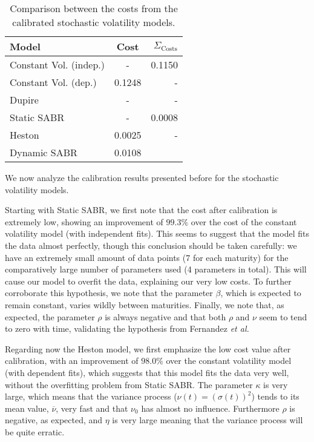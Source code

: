 \begin{table}[H]
    \centering
        \renewcommand{\arraystretch}{0.8}
\begin{tabular}{@{}lcr@{}}
\toprule
 Model & Cost & $\Sigma_{\mathrm{Costs}}$ \\ \midrule
Constant Vol. (indep.) & - & 0.1150 \\
Constant Vol. (dep.) & 0.1248 & - \\
Dupire & - & - \\
Static SABR & - & 0.0008 \\
Heston & 0.0025 & - \\
Dynamic SABR & 0.0108\\
\bottomrule
\end{tabular}
  \caption{Comparison between the costs from the calibrated stochastic volatility models.}
  \label{tab:CostsCompare}
\end{table} 
 
We now analyze the calibration results presented before for the stochastic volatility models.

Starting with Static SABR, we first note that the cost after calibration is extremely low, showing an improvement of $99.3\%$ over the cost of the constant volatility model (with independent fits). This seems to suggest that the model fits the data almost perfectly, though this conclusion should be taken carefully: we have an extremely small amount of data points (7 for each maturity) for the comparatively large number of parameters used (4 parameters in total). This will cause our model to overfit the data, explaining our very low costs. To further corroborate this hypothesis, we note that the parameter $\beta$, which is expected to remain constant, varies wildly between maturities.
Finally, we note that, as expected, the parameter $\rho$ is always negative and that both $\rho$ and $\nu$ seem to tend to zero with time, validating the hypothesis from Fernandez \textit{et al.}
 

Regarding now the Heston model, we first emphasize the low cost value after calibration, with an improvement of $98.0\%$ over the constant volatility model (with dependent fits), which suggests that this model fits the data very well, without the overfitting problem from Static SABR.
The parameter $\kappa$ is very large, which means that the variance process ($\nu(t)=(\sigma(t))^2$) tends to its mean value, $\overline{\nu}$, very fast and that $\nu_0$ has almost no influence. Furthermore $\rho$ is negative, as expected, and $\eta$ is very large meaning that the variance process will be quite erratic.
 
